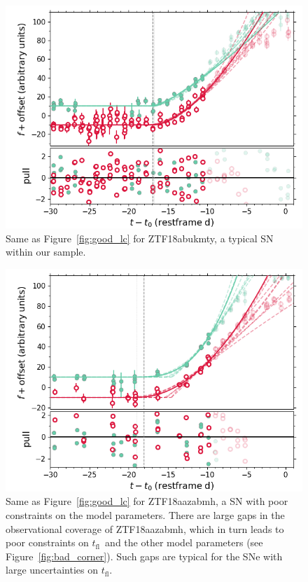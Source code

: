 \documentclass[twocolumn]{aastex63}
\newcommand{\tfl}{$t_\mathrm{fl}$}
\begin{document}
\begin{figure}
    \centering
    \includegraphics[width=1\linewidth]{./figures/ZTF18abukmty_model_lc.png}
    \caption{Same as Figure~\ref{fig:good_lc} for ZTF18abukmty, a typical
    SN within our sample.}
    \label{fig:median_lc}
\end{figure}

\begin{figure}
    \centering
    \includegraphics[width=1\linewidth]{./figures/ZTF18aazabmh_model_lc.png}
    \caption{Same as Figure~\ref{fig:good_lc} for ZTF18aazabmh, a SN with
    poor constraints on the model parameters. There are large gaps in the
    observational coverage of ZTF18aazabmh, which in turn leads to poor
    constraints on \tfl\ and the other model parameters (see
    Figure~\ref{fig:bad_corner}). Such gaps are typical for the SNe with
    large uncertainties on \tfl.}
    \label{fig:bad_lc}
\end{figure}
\end{document}
